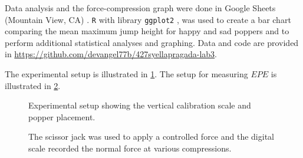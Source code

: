 \documentclass[reprint,amsmath,amssymb,aps,twoside]{revtex4-2} %
\begin{document}
Data analysis and the force-compression graph were done in Google Sheets (Mountain View, CA) \cite{starnes:2015:practice}. \texttt{R} with library \texttt{ggplot2} \cite{R,ggplot2,dplyr}, was used to create a bar chart comparing the mean maximum jump height for happy and sad poppers and to perform additional statistical analyses and graphing. Data and code are provided in \url{https://github.com/devangel77b/427syellapragada-lab3}. 

The experimental setup is illustrated in \cref{fig:setup}. The setup for measuring $EPE$ is illustrated in \cref{fig:setup_epe}.
\begin{figure}
\begin{center}

\end{center}
\caption{Experimental setup showing the vertical calibration scale and popper placement.}
\label{fig:setup} 
\end{figure}

\begin{figure}
\begin{center}

\end{center}
\caption{The scissor jack was used to apply a controlled force and the digital scale recorded the normal force at various compressions.}
\label{fig:setup_epe}
\end{figure}
\end{document}
